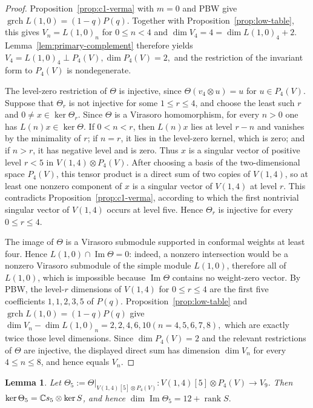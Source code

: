 \documentclass[10pt,a4paper]{amsart}
\numberwithin{equation}{section} \newtheorem{thm}{Theorem}[section] \newtheorem{lem}[thm]{Lemma} \newtheorem{ex}[thm]{Example} \newtheorem{prop}[thm]{Proposition} \newtheorem{cor}[thm]{Corollary} \newtheorem{defi}[thm]{Definition} \newtheorem{rmk}[thm]{Remark} \newtheorem{notation}[thm]{Notation}
\newcommand{\grch}{\operatorname{grch}}
\begin{document}
\begin{proof}
Proposition~\ref{prop:c1-verma} with $m=0$ and PBW give \(\grch L(1,0)=(1-q)P(q).\) Together with Proposition~\ref{prop:low-table}, this gives $V_n=L(1,0)_n$ for $0\le n<4$ and \(\dim V_4=4=\dim L(1,0)_4+2.\) Lemma~\ref{lem:primary-complement} therefore yields \(V_4=L(1,0)_4\mathbin{\perp}P_4(V), \dim P_4(V)=2,\) and the restriction of the invariant form to $P_4(V)$ is nondegenerate.

The level-zero restriction of $\Theta$ is injective, since \(\Theta(v_4\otimes u)=u\) for $u\in P_4(V)$. Suppose that $\Theta_r$ is not injective for some $1\le r\le4$, and choose the least such $r$ and $0\ne x\in\ker\Theta_r$. Since $\Theta$ is a Virasoro homomorphism, for every $n>0$ one has $L(n)x\in\ker\Theta$. If $0<n<r$, then $L(n)x$ lies at level $r-n$ and vanishes by the minimality of $r$; if $n=r$, it lies in the level-zero kernel, which is zero; and if $n>r$, it has negative level and is zero. Thus $x$ is a singular vector of positive level $r<5$ in $V(1,4)\otimes P_4(V)$. After choosing a basis of the two-dimensional space $P_4(V)$, this tensor product is a direct sum of two copies of $V(1,4)$, so at least one nonzero component of $x$ is a singular vector of $V(1,4)$ at level $r$. This contradicts Proposition~\ref{prop:c1-verma}, according to which the first nontrivial singular vector of $V(1,4)$ occurs at level five. Hence $\Theta_r$ is injective for every $0\le r\le4$.

The image of $\Theta$ is a Virasoro submodule supported in conformal weights at least four. Hence \(L(1,0)\cap\operatorname{Im}\Theta=0\): indeed, a nonzero intersection would be a nonzero Virasoro submodule of the simple module $L(1,0)$, therefore all of $L(1,0)$, which is impossible because $\operatorname{Im}\Theta$ contains no weight-zero vector. By PBW, the level-$r$ dimensions of $V(1,4)$ for $0\le r\le4$ are the first five coefficients $1,1,2,3,5$ of $P(q)$. Proposition~\ref{prop:low-table} and \(\grch L(1,0)=(1-q)P(q)\) give \(\dim V_n-\dim L(1,0)_n=2,2,4,6,10 (n=4,5,6,7,8),\) which are exactly twice those level dimensions. Since $\dim P_4(V)=2$ and the relevant restrictions of $\Theta$ are injective, the displayed direct sum has dimension $\dim V_n$ for every $4\le n\le8$, and hence equals $V_n$.
\end{proof}

\begin{lem}\label{lem:k4-kernel}
Let \(\Theta_5:=\Theta|_{V(1,4)[5]\otimes P_4(V)}: V(1,4)[5]\otimes P_4(V)\longrightarrow V_9\). Then \(\ker\Theta_5=\mathbb{C} s_5\otimes\ker S\), and hence \(\dim\operatorname{Im}\Theta_5=12+\operatorname{rank}S.\)
\end{lem}
\end{document}
